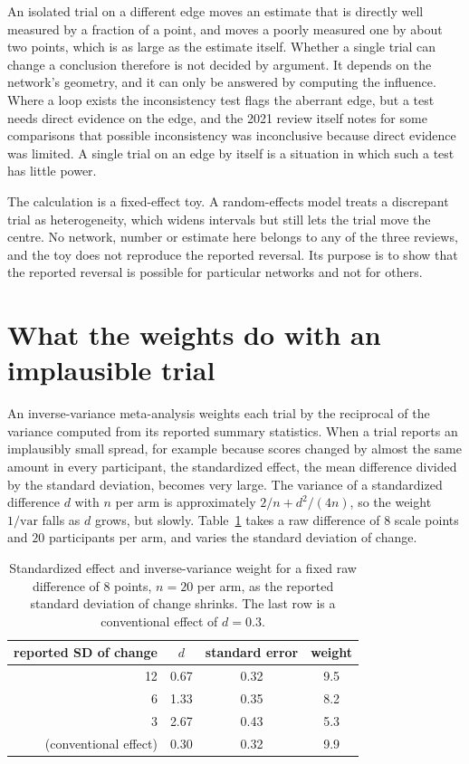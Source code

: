 \documentclass[11pt]{article}
\theoremstyle{definition}
\begin{document}
An isolated trial on a different edge moves an estimate that is directly well measured by a fraction of a point, and moves a poorly measured one by about two points, which is as large as the estimate itself. Whether a single trial can change a conclusion therefore is not decided by argument. It depends on the network's geometry, and it can only be answered by computing the influence. Where a loop exists the inconsistency test flags the aberrant edge, but a test needs direct evidence on the edge, and the 2021 review itself notes for some comparisons that possible inconsistency was inconclusive because direct evidence was limited. A single trial on an edge by itself is a situation in which such a test has little power.

The calculation is a fixed-effect toy. A random-effects model treats a discrepant trial as heterogeneity, which widens intervals but still lets the trial move the centre. No network, number or estimate here belongs to any of the three reviews, and the toy does not reproduce the reported reversal. Its purpose is to show that the reported reversal is possible for particular networks and not for others.

\section{What the weights do with an implausible trial}

An inverse-variance meta-analysis weights each trial by the reciprocal of the variance computed from its reported summary statistics. When a trial reports an implausibly small spread, for example because scores changed by almost the same amount in every participant, the standardized effect, the mean difference divided by the standard deviation, becomes very large. The variance of a standardized difference $d$ with $n$ per arm is approximately $2/n+d^2/(4n)$, so the weight $1/\mathrm{var}$ falls as $d$ grows, but slowly. Table~\ref{tab:smd} takes a raw difference of $8$ scale points and $20$ participants per arm, and varies the standard deviation of change.

\begin{table}[h]
\centering
\caption{Standardized effect and inverse-variance weight for a fixed raw difference of 8 points, $n=20$ per arm, as the reported standard deviation of change shrinks. The last row is a conventional effect of $d=0.3$.}
\label{tab:smd}
\begin{tabular}{rccc}
\toprule
reported SD of change & $d$ & standard error & weight \\
\midrule
12 & 0.67 & 0.32 & 9.5 \\
6 & 1.33 & 0.35 & 8.2 \\
3 & 2.67 & 0.43 & 5.3 \\
\midrule
(conventional effect) & 0.30 & 0.32 & 9.9 \\
\bottomrule
\end{tabular}
\end{table}
\end{document}

